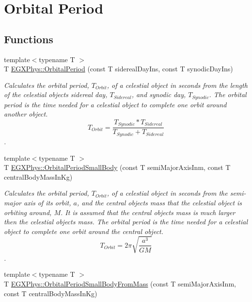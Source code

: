 \hypertarget{group___e_g_x_phys-_astrophysic-_orbital_period}{}\section{Orbital Period}
\label{group___e_g_x_phys-_astrophysic-_orbital_period}
\subsection*{Functions}
\begin{DoxyCompactItemize}
\item 
{\footnotesize template$<$typename T $>$ }\\T \mbox{\hyperlink{group___e_g_x_phys-_astrophysic-_orbital_period_ga76aac7afe3b7a30a785259e9eeb0c139}{E\+G\+X\+Phys\+::\+Orbital\+Period}} (const T sidereal\+Day\+Ins, const T synodic\+Day\+Ins)
\begin{DoxyCompactList}\small\item\em Calculates the orbital period, $T_{Orbit}$, of a celestial object in seconds from the length of the celestial object\textquotesingle{}s sidereal day, $T_{Sidereal}$, and synodic day, $T_{Synodic}$. The orbital period is the time needed for a celestial object to complete one orbit around another object. \[ T_{Orbit}=\dfrac{T_{Synodic} * T_{Sidereal}}{T_{Synodic} + T_{Sidereal}}\]. \end{DoxyCompactList}\item 
{\footnotesize template$<$typename T $>$ }\\T \mbox{\hyperlink{group___e_g_x_phys-_astrophysic-_orbital_period_ga5d4cc706d875fd82a83e566ade16546d}{E\+G\+X\+Phys\+::\+Orbital\+Period\+Small\+Body}} (const T semi\+Major\+Axis\+Inm, const T central\+Body\+Mass\+In\+Kg)
\begin{DoxyCompactList}\small\item\em Calculates the orbital period, $T_{Orbit}$, of a celestial object in seconds from the semi-\/major axis of its orbit, $a$, and the central object\textquotesingle{}s mass that the celestial object is orbiting around, $M$. It is assumed that the central object\textquotesingle{}s mass is much larger then the celestial objects mass. The orbital period is the time needed for a celestial object to complete one orbit around the central object. \[ T_{Orbit}=2\pi\sqrt{\dfrac{a^3}{GM}}\]. \end{DoxyCompactList}\item 
{\footnotesize template$<$typename T $>$ }\\T \mbox{\hyperlink{group___e_g_x_phys-_astrophysic-_orbital_period_gadfd6fdd5cb1861d8204c3c5cd32a65b5}{E\+G\+X\+Phys\+::\+Orbital\+Period\+Small\+Body\+From\+Mass}} (const T semi\+Major\+Axis\+Inm, const T central\+Body\+Mass\+In\+Kg)

\end{DoxyCompactItemize}

